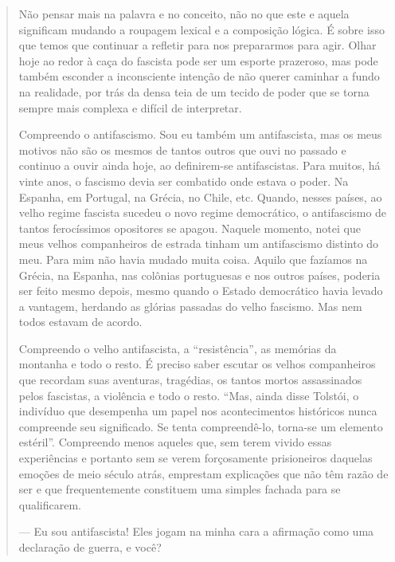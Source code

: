 \begin{quote}
Não pensar mais na palavra e no conceito, não no que este e aquela
significam mudando a roupagem lexical e a composição lógica. É sobre
isso que temos que continuar a refletir para nos prepararmos para agir.
Olhar hoje ao redor à caça do fascista pode ser um esporte prazeroso,
mas pode também esconder a inconsciente intenção de não querer caminhar
a fundo na realidade, por trás da densa teia de um tecido de poder que
se torna sempre mais complexa e difícil de interpretar.

Compreendo o antifascismo. Sou eu também um antifascista, mas os meus
motivos não são os mesmos de tantos outros que ouvi no passado e
continuo a ouvir ainda hoje, ao definirem-se antifascistas. Para muitos,
há vinte anos, o fascismo devia ser combatido onde estava o poder. Na
Espanha, em Portugal, na Grécia, no Chile, etc. Quando, nesses países,
ao velho regime fascista sucedeu o novo regime democrático, o
antifascismo de tantos ferocíssimos opositores se apagou. Naquele
momento, notei que meus velhos companheiros de estrada tinham um
antifascismo distinto do meu. Para mim não havia mudado muita coisa.
Aquilo que fazíamos na Grécia, na Espanha, nas colônias portuguesas e
nos outros países, poderia ser feito mesmo depois, mesmo quando o Estado
democrático havia levado a vantagem, herdando as glórias passadas do
velho fascismo. Mas nem todos estavam de acordo.

Compreendo o velho antifascista, a ``resistência'', as memórias da
montanha e todo o resto. É preciso saber escutar os velhos companheiros
que recordam suas aventuras, tragédias, os tantos mortos assassinados
pelos fascistas, a violência e todo o resto. ``Mas, ainda disse Tolstói,
o indivíduo que desempenha um papel nos acontecimentos históricos nunca
compreende seu significado. Se tenta compreendê-lo, torna-se um elemento
estéril''. Compreendo menos aqueles que, sem terem vivido essas
experiências e portanto sem se verem forçosamente prisioneiros daquelas
emoções de meio século atrás, emprestam explicações que não têm razão de
ser e que frequentemente constituem uma simples fachada para se
qualificarem.

--- Eu sou antifascista! Eles jogam na minha cara a afirmação como uma
declaração de guerra, e você?


\end{quote}
